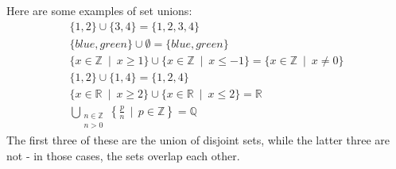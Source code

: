 \documentclass{article}
\renewcommand{\geq}{\geqslant}
\renewcommand{\leq}{\leqslant}
\newcommand{\Ints}{\mathbb{Z}}
\newcommand{\Rats}{\mathbb{Q}}
\newcommand{\Reals}{\mathbb{R}}
\begin{document}
Here are some examples of set unions:
\begin{gather*}
\{1,2\}\cup\{3,4\} = \{1,2,3,4\}\\
\{blue, green\}\cup\emptyset = \{blue, green\}\\
\{x\in\Ints\ \mid\ x\geq 1\}\cup\{x\in\Ints\ \mid\ x\leq -1\} = \{x\in\Ints\ \mid\ x\neq 0\}\\
\{1,2\}\cup\{1,4\} = \{1,2,4\}\\
\{x\in\Reals\ \mid\ x\geq 2\}\cup\{x\in\Reals\ \mid\ x\leq 2\} = \Reals\\
\bigcup_{\substack{n\in\Ints\\n>0}} \left\{\frac{p}{n}\,\mid\,p\in\Ints\right\} = \Rats
\end{gather*}
The first three of these are the union of disjoint sets, while the latter three are not - in those cases, the sets overlap each other.
\end{document}
